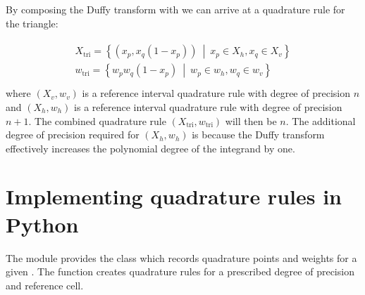 \documentclass{book}
\begin{document}
By composing the Duffy transform with {\hyperref[\detokenize{1_quadrature:equation-squarequad}]{}} we can arrive
at a quadrature rule for the triangle:

\label{\detokenize{1_quadrature:equation-triquad}}\begin{align}\label{equation:1_quadrature:triquad}\!\begin{aligned}
X_\textrm{tri} =\left\{ \left(x_p, x_q(1 - x_p)\right)\ \middle|\ x_p \in X_h, x_q \in X_v \right\}\\
w_\textrm{tri} = \left\{ w_p w_q(1 - x_p)\ \middle|\ w_p \in w_h, w_q \in w_v \right\}\\
\end{aligned}\end{align}
where \((X_v, w_v)\) is a reference interval quadrature rule with degree
of precision \(n\) and \((X_h, w_h)\) is a reference interval quadrature
rule with degree of precision \(n+1\). The combined quadrature rule
\((X_\textrm{tri}, w_\textrm{tri})\) will then be \(n\). The additional
degree of precision required for \((X_h, w_h)\) is because the Duffy
transform effectively increases the polynomial degree of the integrand
by one.


\section{Implementing quadrature rules in Python}
\label{\detokenize{1_quadrature:implementing-quadrature-rules-in-python}}
The  module provides the
 class which records
quadrature points and weights for a given
. The
 function creates
quadrature rules for a prescribed degree of precision and reference
cell.
\end{document}
